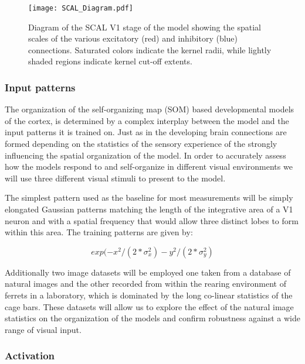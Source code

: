\begin{figure}
	\centering
        \texttt{[image: SCAL\_Diagram.pdf]}
	\caption[Schematic representation of the SCAL model.]{Diagram of
      the SCAL V1 stage of the model showing the spatial scales of the
      various excitatory (red) and inhibitory (blue)
      connections. Saturated colors indicate the kernel radii, while
      lightly shaded regions indicate kernel cut-off extents.}
	\label{SCALDiagram}
\end{figure}

\subsubsection{Input patterns}

The organization of the self-organizing map (SOM) based developmental
models of the cortex, is determined by a complex interplay between the
model and the input patterns it is trained on. Just as in the
developing brain connections are formed depending on the statistics of
the sensory experience of the strongly influencing the spatial
organization of the model. In order to accurately assess how the
models respond to and self-organize in different visual environments
we will use three different visual stimuli to present to the model.

The simplest pattern used as the baseline for most measurements will
be simply elongated Gaussian patterns matching the length of the
integrative area of a V1 neuron and with a spatial frequency that
would allow three distinct lobes to form within this area. The
training patterns are given by:

\begin{equation}
  exp(-x^2/(2*\sigma_x^2) - y^2/(2*\sigma_y^2)
\label{eqn:gausspattern}
\end{equation}

Additionally two image datasets will be employed one taken from a
database of natural images and the other recorded from within the
rearing environment of ferrets in a laboratory, which is dominated by
the long co-linear statistics of the cage bars. These datasets will
allow us to explore the effect of the natural image statistics on the
organization of the models and confirm robustness against a wide range
of visual input.

\subsubsection{Activation}

